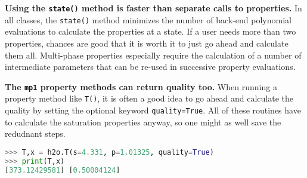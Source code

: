 {\bf Using the \texttt{state()} method is faster than separate calls to properties.}  In all classes, the \verb|state()| method minimizes the number of back-end polynomial evaluations to calculate the properties at a state.  If a user needs more than two properties, chances are good that it is worth it to just go ahead and calculate them all.  Multi-phase properties especially require the calculation of a number of intermediate parameters that can be re-used in successive property evaluations.

{\bf The \texttt{mp1} property methods can return quality too.}  When running a property method like \verb|T()|, it is often a good idea to go ahead and calculate the quality by setting the optional keyword \verb|quality=True|.  All of these routines have to calculate the saturation properties anyway, so one might as well save the redudnant steps.
\begin{lstlisting}[language=Python]
>>> T,x = h2o.T(s=4.331, p=1.01325, quality=True)
>>> print(T,x)
[373.12429581] [0.50004124]
\end{lstlisting}
